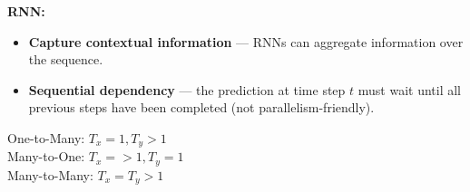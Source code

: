\documentclass[8pt,twocolumn]{article}
\begin{document}
\textbf{RNN:}\vspace{-0.6em}
\begin{itemize}
    \setlength{\itemsep}{0pt}
    \setlength{\parskip}{0pt}
    \item \textbf{Capture contextual information} — RNNs can aggregate information over the sequence.
    \item \textbf{Sequential dependency} — the prediction at time step \(t\) must wait until all previous steps have been completed (not parallelism-friendly).
  \end{itemize}  \vspace{-0.6em}
One-to-Many: $T_x = 1, T_y > 1$\\
\noindent{}
Many-to-One: $T_x = > 1, T_y = 1$\\
  \noindent{}
Many-to-Many: $T_x = T_y > 1$\\
  \noindent{}
\end{document}
